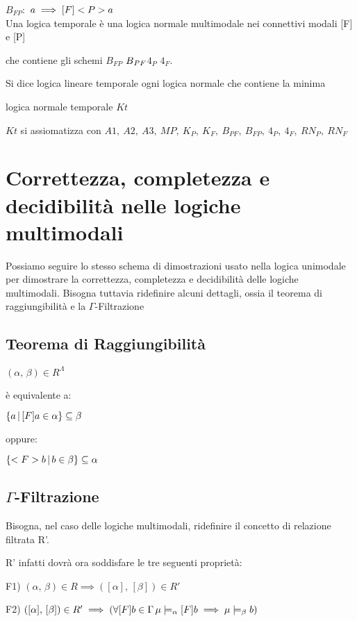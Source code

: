 $B_{FP}:$ $a\implies[F]<P>a$\\


Una logica temporale è una logica normale multimodale nei connettivi
modali {[}F{]} e {[}P{]}

che contiene gli schemi $B_{FP}$ $B\mbox{\ensuremath{_{PF}}}$$4_{P}$
$4_{F}$.

Si dice logica lineare temporale ogni logica normale che contiene
la minima

logica normale temporale $Kt$

$Kt$ si assiomatizza con $A1,\ A2,\ A3,\ MP,\ K_{P},\ K_{F},\ B_{PF},\ B_{FP},\ 4_{P},\ 4_{F},\ RN_{P},\ RN_{F}$


\section{Correttezza, completezza e decidibilità nelle logiche multimodali}

Possiamo seguire lo stesso schema di dimostrazioni usato nella logica
unimodale per dimostrare la correttezza, completezza e decidibilità
delle logiche multimodali. Bisogna tuttavia ridefinire alcuni dettagli,
ossia il teorema di raggiungibilità e la $\Gamma$-Filtrazione


\subsection{Teorema di Raggiungibilità}

$(\alpha,\,\beta)\in R^{\Lambda}$

è equivalente a:

$\{a\,|\,[F]a\in\alpha\}\subseteq\beta$

oppure:

$\{<F>b\,|\, b\in\beta\}\subseteq\alpha$


\subsection{$\Gamma$-Filtrazione}

Bisogna, nel caso delle logiche multimodali, ridefinire il concetto
di relazione filtrata R'.

R' infatti dovrà ora soddisfare le tre seguenti proprietà:

F1) $(\alpha,\,\beta)\in R\implies([\alpha],\,[\beta])\in R'$

F2) $([\alpha],\,[\beta])\in R'\implies(\forall[F]b\in\Gamma\,\mu\models_{\alpha}[F]b\implies\mu\models_{\beta}b)$

